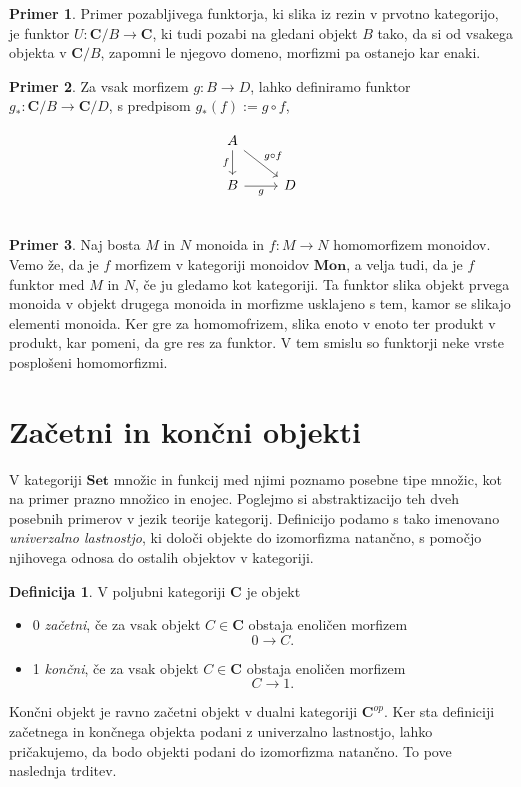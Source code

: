 \documentclass[12pt,a4paper]{book}
\theoremstyle{definition}
\newtheorem{definicija}{Definicija}[chapter]
\theoremstyle{plain}
\theoremstyle{definition}
\newtheorem{primer}{Primer}[section]
\theoremstyle{remark}
\newcommand{\cat}[1]{\textbf{#1}}
\begin{document}
\begin{primer}
Primer pozabljivega funktorja, ki slika iz rezin v prvotno kategorijo, je funktor $U : \cat{C}/B \to \cat{C}$, ki tudi pozabi na gledani objekt $B$ tako, da si od vsakega objekta v $\cat{C}/B$, zapomni le njegovo domeno, morfizmi pa ostanejo kar enaki.
\end{primer}

\begin{primer}
Za vsak morfizem $g : B \to D$, lahko definiramo funktor $g_* : \cat{C}/B \to \cat{C}/D$, s predpisom $g_*(f) := g \circ f$,

$$\begin{tikzcd}
A \ar[d, "f"'] \ar[dr, "g \circ f"] & \\
B \ar[r, "g"'] & D \\
\end{tikzcd}$$

\end{primer}

\begin{primer}
Naj bosta $M$ in $N$ monoida in $f : M \to N$ homomorfizem monoidov. Vemo že, da je $f$ morfizem v kategoriji monoidov $\cat{Mon}$, a velja tudi, da je $f$ funktor med $M$ in $N$, če ju gledamo kot kategoriji. Ta funktor slika objekt prvega monoida v objekt drugega monoida in morfizme usklajeno s tem, kamor se slikajo elementi monoida. Ker gre za homomofrizem, slika enoto v enoto ter produkt v produkt, kar pomeni, da gre res za funktor. V tem smislu so funktorji neke vrste posplošeni homomorfizmi.
\end{primer}


\section{Začetni in končni objekti}
V kategoriji $\cat{Set}$ množic in funkcij med njimi poznamo posebne tipe množic, kot na primer prazno množico in enojec. Poglejmo si abstraktizacijo teh dveh posebnih primerov v jezik teorije kategorij. Definicijo podamo s tako imenovano \emph{univerzalno lastnostjo}, ki določi objekte do izomorfizma natančno, s pomočjo njihovega odnosa do ostalih objektov v kategoriji.

\begin{definicija}
V poljubni kategoriji $\cat{C}$ je objekt
\begin{itemize}
\item 0 \emph{začetni}, če za vsak objekt $C \in \cat{C}$ obstaja enoličen morfizem $$0 \to C.$$
\item 1 \emph{končni}, če za vsak objekt $C \in \cat{C}$ obstaja enoličen morfizem $$C \to 1.$$
\end{itemize}
\end{definicija}
Končni objekt je ravno začetni objekt v dualni kategoriji $\cat{C}^{op}$. Ker sta definiciji začetnega in končnega objekta podani z univerzalno lastnostjo, lahko pričakujemo, da bodo objekti podani do izomorfizma natančno. To pove naslednja trditev.
\end{document}
